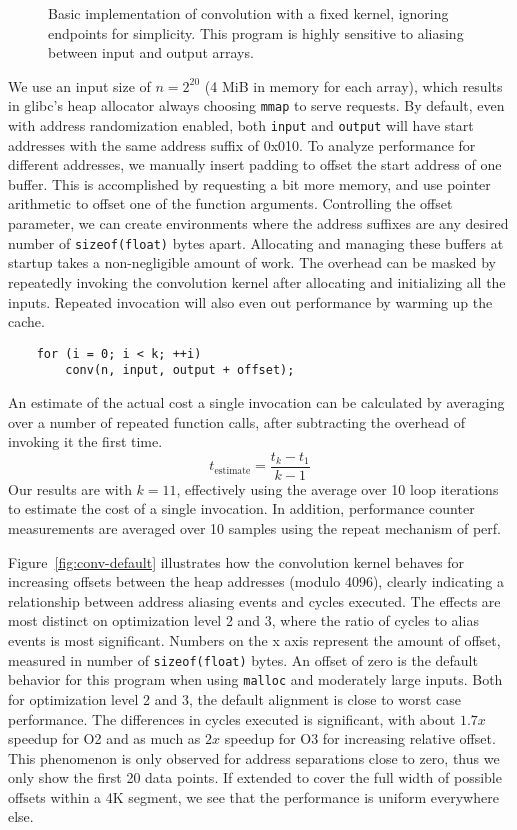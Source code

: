 \documentclass{acm_proc_article-sp}
\begin{document}
\begin{figure}[t]
  \centering
  
  \caption{Basic implementation of convolution with a fixed kernel, ignoring endpoints for simplicity. This program is highly sensitive to aliasing between input and output arrays.}
  \label{lst:conv}
\end{figure}

We use an input size of $n=2^{20}$ (4 MiB in memory for each array), which results in glibc's heap allocator always choosing \texttt{mmap} to serve requests.
By default, even with address randomization enabled, both \texttt{input} and \texttt{output} will have start addresses with the same address suffix of 0x010.
To analyze performance for different addresses, we manually insert padding to offset the start address of one buffer.
This is accomplished by requesting a bit more memory, and use pointer arithmetic to offset one of the function arguments.
Controlling the offset parameter, we can create environments where the address suffixes are any desired number of \texttt{sizeof(float)} bytes apart.
Allocating and managing these buffers at startup takes a non-negligible amount of work.
The overhead can be masked by repeatedly invoking the convolution kernel after allocating and initializing all the inputs.
Repeated invocation will also even out performance by warming up the cache.
\begin{lstlisting}
    for (i = 0; i < k; ++i)
        conv(n, input, output + offset);
\end{lstlisting}
An estimate of the actual cost a single invocation can be calculated by averaging over a number of repeated function calls, after subtracting the overhead of invoking it the first time.
\[
t_{\text{estimate}} = \frac{t_{k} - t_{1}}{k - 1}
\]
Our results are with $k=11$, effectively using the average over 10 loop iterations to estimate the cost of a single invocation.
In addition, performance counter measurements are averaged over 10 samples using the repeat mechanism of perf.

Figure~\ref{fig:conv-default} illustrates how the convolution kernel behaves for increasing offsets between the heap addresses (modulo 4096), clearly indicating a relationship between address aliasing events and cycles executed.
The effects are most distinct on optimization level 2 and 3, where the ratio of cycles to alias events is most significant.
Numbers on the x axis represent the amount of offset, measured in number of \texttt{sizeof(float)} bytes.
An offset of zero is the default behavior for this program when using \texttt{malloc} and moderately large inputs.
Both for optimization level 2 and 3, the default alignment is close to worst case performance.
The differences in cycles executed is significant, with about $1.7x$ speedup for O2 and as much as $2x$ speedup for O3 for increasing relative offset.
This phenomenon is only observed for address separations close to zero, thus we only show the first 20 data points.
If extended to cover the full width of possible offsets within a 4K segment, we see that the performance is uniform everywhere else.
\end{document}
